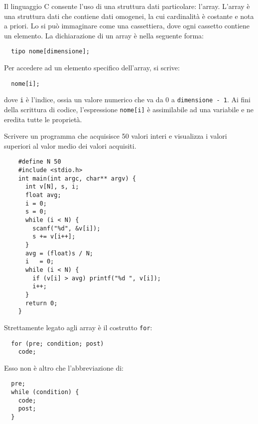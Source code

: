 Il linguaggio C consente l'uso di una struttura dati particolare: l'array. L'array è una struttura dati che contiene dati omogenei, la cui cardinalità è costante e nota a priori. Lo si può immaginare come una cassettiera, dove ogni cassetto contiene un elemento.
La dichiarazione di un array è nella seguente forma:
\begin{verbatim}
  tipo nome[dimensione];
\end{verbatim}
Per accedere ad un elemento specifico dell'array, si scrive:
\begin{verbatim}
  nome[i];
\end{verbatim}
dove \verb|i| è l'indice, ossia un valore numerico che va da 0 a \verb|dimensione - 1|.
Ai fini della scrittura di codice, l'espressione \verb|nome[i]| è assimilabile ad una variabile e ne eredita tutte le proprietà.

\begin{example}
  Scrivere un programma che acquisisce 50 valori interi e visualizza i valori superiori al valor medio dei valori acquisiti.
  \begin{verbatim}
    #define N 50
    #include <stdio.h>
    int main(int argc, char** argv) {
      int v[N], s, i;
      float avg;
      i = 0;
      s = 0;
      while (i < N) {
        scanf("%d", &v[i]);
        s += v[i++];
      }
      avg = (float)s / N;
      i   = 0;
      while (i < N) {
        if (v[i] > avg) printf("%d ", v[i]);
        i++;
      }
      return 0;
    }\end{verbatim}
\end{example}

Strettamente legato agli array è il costrutto \verb|for|:
\begin{verbatim}
  for (pre; condition; post)
    code;
\end{verbatim}
Esso non è altro che l'abbreviazione di:
\begin{verbatim}
  pre;
  while (condition) {
    code;
    post;
  }
\end{verbatim}

